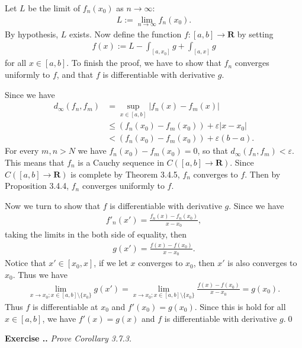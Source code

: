 \documentclass{book}
\newcounter{Exercise}[section]
\renewcommand{\theExercise}{\thesection.\arabic{Exercise}.}
\newcommand{\new}{\vspace{1.5em}\noindent\textbf{Exercise \stepcounter{Exercise}\textbf{\theExercise}} }
\begin{document}
Let $L$ be the limit of $f_n(x_0)$ as $n \to \infty$:
    \begin{align*}
        L := \lim_{n \to \infty} f_n(x_0).
    \end{align*}
By hypothesis, $L$ exists. Now define the function $f : [a, b] \to \mathbf{R}$ by setting
    \begin{align*}
        f(x) := L - \int_{[a, x_0]} g + \int_{[a, x]} g
    \end{align*}
for all $x \in [a, b]$. To finish the proof, we have to show that $f_n$ converges uniformly to $f$, and that $f$ is differentiable with derivative $g$.

Since we have
    \begin{align*}
        d_{\infty}(f_n, f_m)
        &= \sup_{x \in [a, b]} |f_n(x) - f_m(x)|\\
        &\leq (f_n(x_0) - f_m(x_0)) + \varepsilon|x - x_0|\\
        &< (f_n(x_0) - f_m(x_0)) + \varepsilon(b - a).
    \end{align*}
For every $m, n > N$ we have $f_n(x_0) - f_m(x_0) = 0$, so that $d_{\infty}(f_n, f_m) < \varepsilon$. This means that $f_n$ is a Cauchy sequence in $C([a, b] \to \mathbf{R})$. Since $C([a, b] \to \mathbf{R})$ is complete by Theorem 3.4.5, $f_n$ converges to $f$. Then by Proposition 3.4.4, $f_n$ converges uniformly to $f$.

Now we turn to show that $f$ is differentiable with derivative $g$. Since we have
    \begin{align*}
        f'_n(x') = \frac{f_n(x) - f_n(x_0)}{x - x_0},
    \end{align*}
taking the limits in the both side of equality, then
    \begin{align*}
        g(x') = \frac{f(x) - f(x_0)}{x - x_0}.
    \end{align*}
Notice that $x' \in [x_0, x]$, if we let $x$ converges to $x_0$, then $x'$ is also converges to $x_0$. Thus we have
    \begin{align*}
        \lim_{x \to x_0; x \in [a, b] \setminus \{x_0\}} g(x')
        = \lim_{x \to x_0; x \in [a, b] \setminus \{x_0\}} \frac{f(x) - f(x_0)}{x - x_0} = g(x_0).
    \end{align*}
Thus $f$ is differentiable at $x_0$ and $f'(x_0) = g(x_0)$. Since this is hold for all $x \in [a, b]$, we have $f'(x) = g(x)$ and $f$ is differentiable with derivative $g$.\qed

\new\emph{Prove Corollary 3.7.3.}
\end{document}
